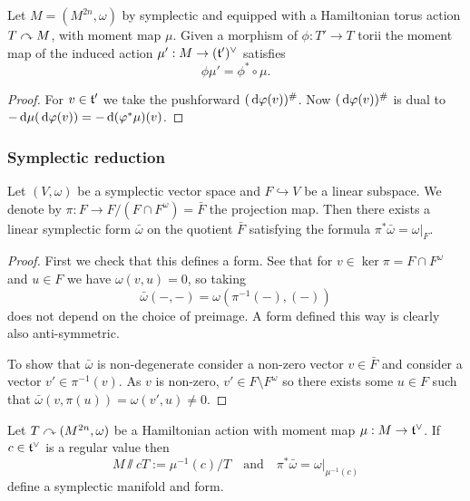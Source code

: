 \begin{lem}
    Let $M=(M^{2n},\omega)$ by symplectic and equipped with a Hamiltonian torus action $T\curvearrowright M$, with moment map $\mu$.
    Given a morphism of $\phi:T'\to T$ torii the moment map of the induced action $\mu':M\to(\mathfrak{t}')^\vee$ satisfies
    \[\phi\mu'=\phi^*\circ\mu.\]
\end{lem}
\begin{proof}
    For $v\in\mathfrak{t}'$ we take the pushforward $(\,\mathrm d\varphi(v))^\#$.
    Now $(\,\mathrm d\varphi(v))^\#$ is dual to $-\,\mathrm d\mu(\,\mathrm d\varphi(v))=-\,\mathrm d(\varphi^*\mu)(v)$.
\end{proof}

\subsubsection*{Symplectic reduction}

\begin{lem}
    Let $(V,\omega)$ be a symplectic vector space and $F\hookrightarrow V$ be a linear subspace.
    We denote by $\pi:F\to F/(F\cap F^\omega)=\bar F$ the projection map.
    Then there exists a linear symplectic form $\bar\omega$ on the quotient $\bar F$ satisfying the formula $\pi^*\bar\omega=\omega|_F$.
\end{lem}

\begin{proof}
    First we check that this defines a form.
    See that for $v\in\ker\pi=F\cap F^\omega$ and $u\in F$ we have $\omega(v,u)=0$, so taking
    \[\bar\omega(-,-)=\omega(\pi^{-1}(-),(-))\]
    does not depend on the choice of preimage.
    A form defined this way is clearly also anti-symmetric.

    To show that $\bar\omega$ is non-degenerate consider a non-zero vector $v\in\bar F$ and consider a vector $v'\in\pi^{-1}(v)$.
    As $v$ is non-zero, $v'\in F\setminus F^\omega$ so there exists some $u\in F$ such that $\bar\omega(v,\pi(u))=\omega(v',u)\neq0$.
\end{proof}

\begin{lem}
    Let $T\curvearrowright(M^{2n},\omega)$ be a Hamiltonian action with moment map $\mu:M\to\mathfrak{t}^\vee$.
    If $c\in\mathfrak{t}^\vee$ is a regular value then
    \[M\sslash{c}T:=\mu^{-1}(c)/T\quad\text{and}\quad\pi^*\bar\omega=\omega|_{\mu^{-1}(c)}\]
    define a symplectic manifold and form.
\end{lem}

